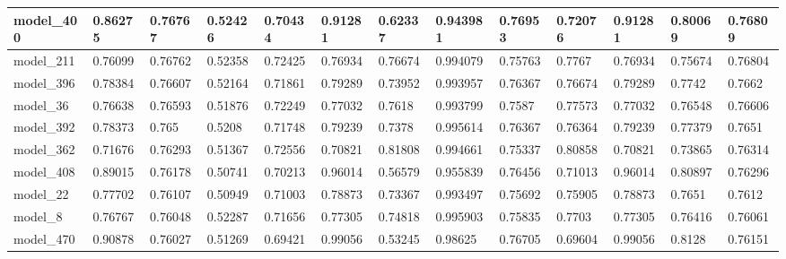 \begin{tabular}{|l|l|l|l|l|l|l|l|l|l|l|l|l|}
model\_400     & 0.86275     & 0.76767        & 0.52426      & 0.70434          & 0.91281              & 0.62337              & 0.943981     & 0.76953           & 0.72076            & 0.91281         & 0.80069     & 0.76809      \\ \hline
model\_211     & 0.76099     & 0.76762        & 0.52358      & 0.72425          & 0.76934              & 0.76674              & 0.994079     & 0.75763           & 0.7767             & 0.76934         & 0.75674     & 0.76804      \\ \hline
model\_396     & 0.78384     & 0.76607        & 0.52164      & 0.71861          & 0.79289              & 0.73952              & 0.993957     & 0.76367           & 0.76674            & 0.79289         & 0.7742      & 0.7662       \\ \hline
model\_36      & 0.76638     & 0.76593        & 0.51876      & 0.72249          & 0.77032              & 0.7618               & 0.993799     & 0.7587            & 0.77573            & 0.77032         & 0.76548     & 0.76606      \\ \hline
model\_392     & 0.78373     & 0.765          & 0.5208       & 0.71748          & 0.79239              & 0.7378               & 0.995614     & 0.76367           & 0.76364            & 0.79239         & 0.77379     & 0.7651       \\ \hline
model\_362     & 0.71676     & 0.76293        & 0.51367      & 0.72556          & 0.70821              & 0.81808              & 0.994661     & 0.75337           & 0.80858            & 0.70821         & 0.73865     & 0.76314      \\ \hline
model\_408     & 0.89015     & 0.76178        & 0.50741      & 0.70213          & 0.96014              & 0.56579              & 0.955839     & 0.76456           & 0.71013            & 0.96014         & 0.80897     & 0.76296      \\ \hline
model\_22      & 0.77702     & 0.76107        & 0.50949      & 0.71003          & 0.78873              & 0.73367              & 0.993497     & 0.75692           & 0.75905            & 0.78873         & 0.7651      & 0.7612       \\ \hline
model\_8       & 0.76767     & 0.76048        & 0.52287      & 0.71656          & 0.77305              & 0.74818              & 0.995903     & 0.75835           & 0.7703             & 0.77305         & 0.76416     & 0.76061      \\ \hline
model\_470     & 0.90878     & 0.76027        & 0.51269      & 0.69421          & 0.99056              & 0.53245              & 0.98625      & 0.76705           & 0.69604            & 0.99056         & 0.8128      & 0.76151      \\ \hline

\end{tabular}
